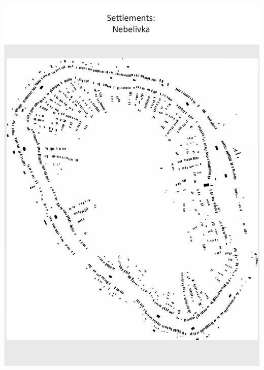 \documentclass[
  12pt,
  a4paper, twoside]{book}
\begin{document}
\begin{center}\includegraphics[width=1\linewidth]{Appendix/nebelivka} \end{center}

\newpage
\end{document}
